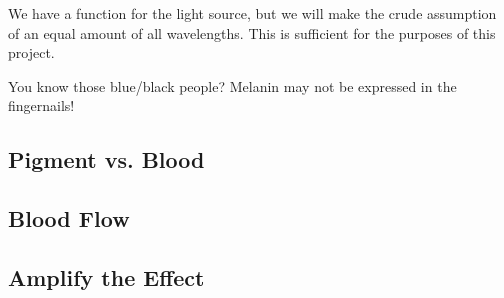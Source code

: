 We have a function for the light source, but we will make the crude assumption of an equal amount of all wavelengths. This is sufficient for the purposes of this project.

You know those blue/black people? Melanin may not be expressed in the fingernails!

\subsection{Pigment vs. Blood}\label{sec:PigmentVs.Blood}

\subsection{Blood Flow}\label{sec:BloodFlow}

\subsection{Amplify the Effect}\label{sec:AmplifyTheEffect}

